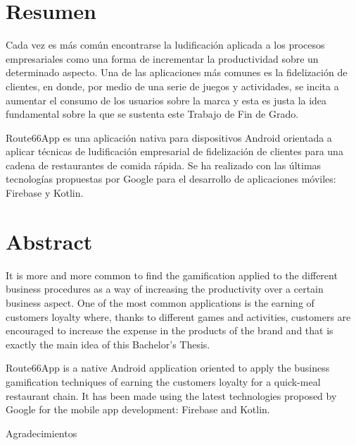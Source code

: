 \documentclass[twoside]{report}
\begin{document}
\newpage
\thispagestyle{empty}
\mbox{}

\clearpage


\section*{Resumen}

Cada vez es más común encontrarse la ludificación aplicada a los procesos empresariales como una forma de incrementar la productividad sobre un determinado aspecto. Una de las aplicaciones más comunes es la fidelización de clientes, en donde, por medio de una serie de juegos y actividades, se incita a aumentar el consumo de los usuarios sobre la marca y esta es justa la idea fundamental sobre la que se sustenta este Trabajo de Fin de Grado.

Route66App es una aplicación nativa para dispositivos Android orientada a aplicar técnicas de ludificación empresarial de fidelización de clientes para una cadena de restaurantes de comida rápida. Se ha realizado con las últimas tecnologías propuestas por Google para el desarrollo de aplicaciones móviles: Firebase y Kotlin.


\section*{Abstract}

It is more and more common to find the gamification applied to the different business procedures as a way of increasing the productivity over a certain business aspect. One of the most common applications is the earning of customers loyalty where, thanks to different games and activities, customers are encouraged to increase the expense in the products of the brand and that is exactly the main idea of this Bachelor's Thesis.

Route66App is a native Android application oriented to apply the business gamification techniques of earning the customers loyalty for a quick-meal restaurant chain. It has been made using the latest technologies proposed by Google for the mobile app development: Firebase and Kotlin.

\clearpage


\hbox{}
\vspace{7cm}
\begin{huge}
Agradecimientos
\end{huge}
\end{document}
